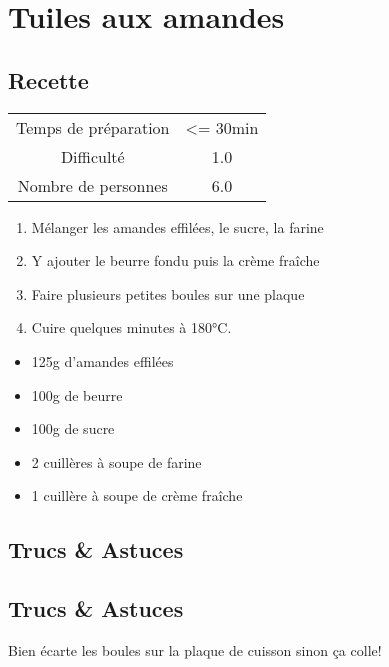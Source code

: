 \newpage
\section{Tuiles aux amandes}
    \label{sec:Tuiles aux amandes}
    \subsection{Recette}
    \vspace{1cm}


    \begin{center}
        \begin{tabular}{c|c}
            Temps de préparation & <= 30min \\
            Difficulté & 1.0 \\
            Nombre de personnes & 6.0 
        \end{tabular}
    \end{center}{}

    \vspace{1cm}
    \hline
    \vspace{1cm}

    \begin{minipage}{.7\textwidth}
        \begin{enumerate}
            \item Mélanger les amandes effilées, le sucre, la farine
	    \item Y ajouter le beurre fondu puis la crème fraîche
	    \item Faire plusieurs petites boules sur une plaque
	    \item Cuire quelques minutes à 180°C.

        \end{enumerate}
    \end{minipage}
    \begin{minipage}{.3\textwidth}
        \begin{flushleft}
        \begin{itemize}
            \item 125g d'amandes effilées
	    \item 100g de beurre
	    \item 100g de sucre
	    \item 2 cuillères à soupe de farine
	    \item 1 cuillère à soupe de crème fraîche

        \end{itemize}
        \end{flushleft}
    \end{minipage}
    
    \vspace{1cm}
    \hline
    \vspace{1cm}
    
    \subsection{Trucs \& Astuces}
        \subsection{Trucs \& Astuces}
	Bien écarte les boules sur la plaque de cuisson sinon ça colle!
